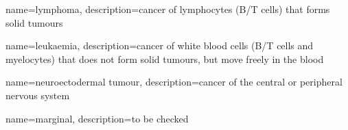 {
        name=lymphoma,
        description={cancer of lymphocytes (B/T cells) that forms solid tumours}
}

{
        name=leukaemia,
        description={cancer of white blood cells (B/T cells and myelocytes) that does not form solid tumours, but move freely in the blood}
}

{
        name=neuroectodermal tumour,
        description={cancer of the central or peripheral nervous system}
}

{
        name=marginal,
        description={to be checked} %
}